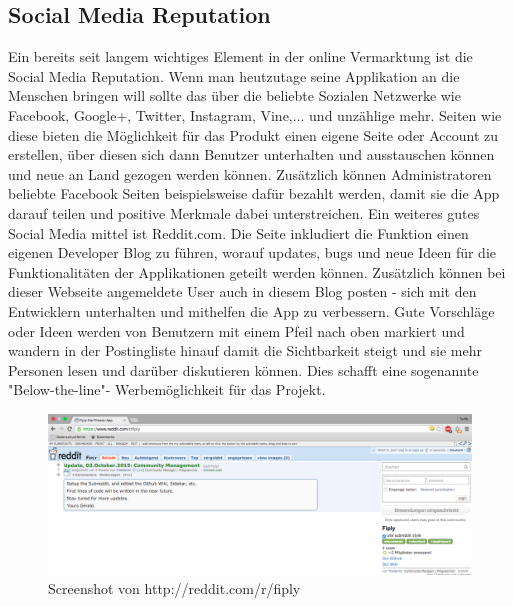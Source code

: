 \documentclass[FIPLY_base.tex]{subfiles}
\begin{document}
\subsection{Social Media Reputation}
Ein bereits seit langem wichtiges Element in der online Vermarktung ist die Social Media Reputation. Wenn man heutzutage seine Applikation an die Menschen bringen will sollte das über die beliebte Sozialen Netzwerke wie Facebook, Google+, Twitter, Instagram, Vine,... und unzählige mehr. Seiten wie diese bieten die Möglichkeit für das Produkt einen eigene Seite oder Account zu erstellen, über diesen sich dann Benutzer unterhalten und ausstauschen können und neue an Land gezogen werden können. Zusätzlich können Administratoren beliebte Facebook Seiten beispielsweise dafür bezahlt werden, damit sie die App darauf teilen und positive Merkmale dabei unterstreichen. 
\newline
Ein weiteres gutes Social Media mittel ist Reddit.com. Die Seite inkludiert die Funktion einen eigenen Developer Blog zu führen, worauf updates, bugs und neue Ideen für die Funktionalitäten der Applikationen geteilt werden können. Zusätzlich können bei dieser Webseite angemeldete User auch in diesem Blog posten - sich mit den Entwicklern unterhalten und mithelfen die App zu verbessern. Gute Vorschläge oder Ideen werden von Benutzern mit einem Pfeil nach oben markiert und wandern in der Postingliste hinauf damit die Sichtbarkeit steigt und sie mehr Personen lesen und darüber diskutieren können. Dies schafft eine sogenannte "Below-the-line"- Werbemöglichkeit für das Projekt.

\begin{figure}[h]
	\centering
	\includegraphics[scale=0.28]{img/fiplysubredditscreenshot}
	\caption{Screenshot von http://reddit.com/r/fiply}
\end{figure}

\newpage
\end{document}
